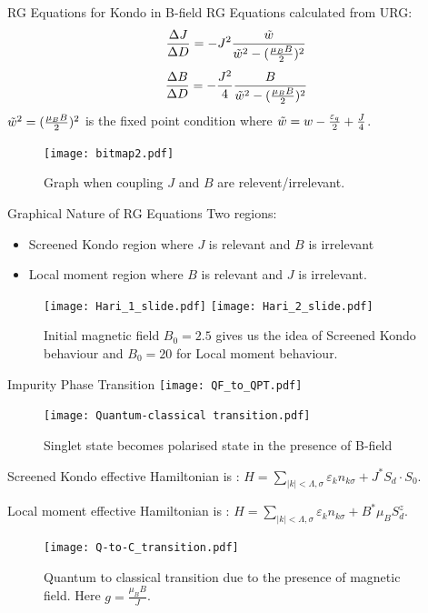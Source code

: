 \documentclass{beamer}
\begin{document}
\begin{frame}{RG Equations for Kondo in B-field}
RG Equations calculated from URG:
\begin{equation*}
\frac{\Delta J}{\Delta D} =- J^2 \frac{\Tilde{w}}{\Tilde{w}^2 - (\frac{\mu_B B}{2})^2}
\end{equation*}
 \begin{equation*}
 \frac{\Delta B} {\Delta D}=- \frac{J^2}{4} \frac{B}{\Tilde{w}^2 - (\frac{\mu_B B}{2})^2}
 \end{equation*}
$\Tilde{w}^2 = (\frac{\mu_B B}{2})^2$ is the \alert{fixed point} condition where $\Tilde{w} = w - \frac{\varepsilon_q}{2} + \frac{J}{4}$. 
\begin{figure}[!ht]
    \centering
    \texttt{[image: bitmap2.pdf]}
    \caption{Graph when coupling $J$ and $B$ are relevent/irrelevant.}
\end{figure}
\end{frame}

\begin{frame}{Graphical Nature of RG Equations}
Two regions: 
\begin{itemize}
\item \alert{Screened Kondo} region where  $J$ is relevant and $B$ is irrelevant
\item \alert{Local moment} region where $B$ is relevant and $J$ is irrelevant. 
\end{itemize}
\begin{figure}[!ht]
    \centering
    \texttt{[image: Hari\_1\_slide.pdf]}
    \texttt{[image: Hari\_2\_slide.pdf]}
    \caption{Initial magnetic field $B_0=2.5$ gives us the idea of \alert{S}creened Kondo behaviour and $B_0 = 20$ for \alert{L}ocal moment behaviour.}
\end{figure}
\end{frame}

\begin{frame}{Impurity Phase Transition   {\hfill\texttt{[image: QF\_to\_QPT.pdf]}\hfill}}

\begin{figure}[!ht]
    \centering
    \texttt{[image: Quantum-classical transition.pdf]}
    \caption{{\small Singlet state becomes polarised state in the presence of B-field}}
\end{figure}

Screened Kondo effective Hamiltonian is :
 $ H = \sum_{ |k|< \Lambda,\sigma} \varepsilon_k n_{k \sigma} + J^* S_d \cdot S_0 $.

Local moment effective Hamiltonian is : 
$ H = \sum_{|k| < \Lambda, \sigma} \varepsilon_k n_{k \sigma} + B^* \mu_B S_d^z$.

\begin{figure}[!ht]
    \centering
    \texttt{[image: Q-to-C\_transition.pdf]}
    \caption{{\small Quantum to classical transition due to the presence of magnetic field. Here $g=\frac{\mu_B B}{J}$.}}
\end{figure}

\end{frame}
\end{document}
